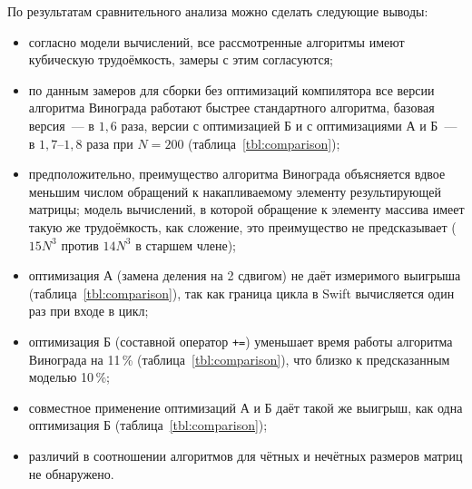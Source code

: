 По результатам сравнительного анализа можно сделать следующие выводы:
\begin{itemize}
	\item согласно модели вычислений, все рассмотренные алгоритмы имеют кубическую трудоёмкость, замеры с этим согласуются;
	\item по данным замеров для сборки без оптимизаций компилятора все версии алгоритма Винограда работают быстрее стандартного алгоритма, базовая версия~--- в $1{,}6$ раза, версии с оптимизацией Б и с оптимизациями А и Б~--- в $1{,}7$--$1{,}8$ раза при $N = 200$ (таблица~\ref{tbl:comparison});
	\item предположительно, преимущество алгоритма Винограда объясняется вдвое меньшим числом обращений к накапливаемому элементу результирующей матрицы; модель вычислений, в которой обращение к элементу массива имеет такую же трудоёмкость, как сложение, это преимущество не предсказывает ($15N^3$ против $14N^3$ в старшем члене);
	\item оптимизация А (замена деления на 2 сдвигом) не даёт измеримого выигрыша (таблица~\ref{tbl:comparison}), так как граница цикла в Swift вычисляется один раз при входе в цикл;
	\item оптимизация Б (составной оператор \texttt{+=}) уменьшает время работы алгоритма Винограда на 11\,\% (таблица~\ref{tbl:comparison}), что близко к предсказанным моделью 10\,\%;
	\item совместное применение оптимизаций А и Б даёт такой же выигрыш, как одна оптимизация Б (таблица~\ref{tbl:comparison});
	\item различий в соотношении алгоритмов для чётных и нечётных размеров матриц не обнаружено.
\end{itemize}
